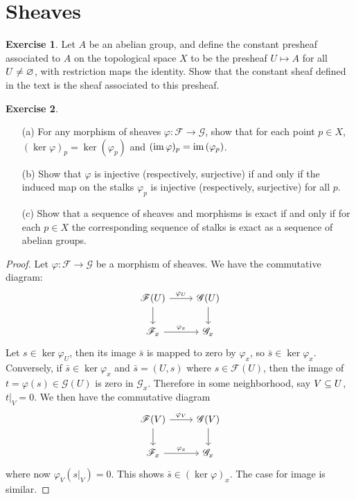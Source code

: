 \documentclass[11pt]{book}
\theoremstyle{definition}
\newtheorem{exercise}{Exercise}[section]
\begin{document}
\section{Sheaves}
\begin{exercise}
Let $A$ be an abelian group, and define the constant presheaf associated to $A$ on the topological space $X$ to be the presheaf $U\mapsto A$ for all $U\neq\varnothing$, with restriction maps the identity. Show that the constant sheaf defined in the text is the sheaf associated to this presheaf.
\end{exercise}
\begin{exercise}
\mbox{}
\begin{itemize}
\item[(a)] For any morphism of sheaves $\varphi:\mathscr{F}\to\mathscr{G}$, show that for each point $p\in X$, $(\ker\varphi)_p=\ker(\varphi_p)$ and $(\mathrm{im}\,\varphi)_p=\mathrm{im}\,(\varphi_p)$.
\item[(b)] Show that $\varphi$ is injective (respectively, surjective) if and only if the induced map on the stalks $\varphi_p$ is injective (respectively, surjective) for all $p$.
\item[(c)] Show that a sequence of sheaves and morphisms is exact if and only if for each $p\in X$ the corresponding sequence of stalks is exact as a sequence of abelian groups. 
\end{itemize}
\end{exercise}
\begin{proof}
Let $\varphi:\mathscr{F}\to\mathscr{G}$ be a morphism of sheaves. We have the commutative diagram:
\[\begin{tikzcd}
\mathscr{F}(U)\ar[d]\ar[r,"\varphi_U"]&\mathscr{G}(U)\ar[d]\\
\mathscr{F}_x\ar[r,"\varphi_x"]&\mathscr{G}_x
\end{tikzcd}\]
Let $s\in\ker\varphi_U$, then its image $\bar{s}$ is mapped to zero by $\varphi_x$, so $\bar{s}\in\ker\varphi_x$. Conversely, if $\bar{s}\in\ker\varphi_x$ and $\bar{s}=(U,s)$ where $s\in\mathscr{F}(U)$, then the image of $t=\varphi(s)\in\mathscr{G}(U)$ is zero in $\mathscr{G}_x$. Therefore in some neighborhood, say $V\subseteq U$, $t|_V=0$. We then have the commutative diagram
\[\begin{tikzcd}
\mathscr{F}(V)\ar[d]\ar[r,"\varphi_V"]&\mathscr{G}(V)\ar[d]\\
\mathscr{F}_x\ar[r,"\varphi_x"]&\mathscr{G}_x
\end{tikzcd}\]
where now $\varphi_V(s|_V)=0$. This shows $\bar{s}\in(\ker\varphi)_x$. The case for image is similar.
\end{proof}
\end{document}
